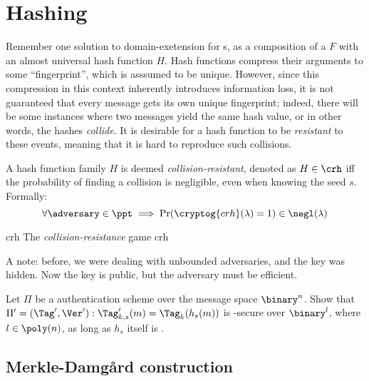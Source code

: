 \section{Hashing}

Remember one solution to domain-exetension for \prf{}s, as a composition of a \prf{} $F$ with an almost universal hash function $H$. Hash functions compress their arguments to some ``fingerprint'', which is asssumed to be unique. However, since this compression in this context inherently introduces information loss, it is not guaranteed that every message gets its own unique fingerprint; indeed, there will be some instances where two messages yield the same hash value, or in other words, the hashes \emph{collide}. It is desirable for a hash function to be \emph{resistant} to these events, meaning that it is hard to reproduce such collisions.

\begin{definition}
    A hash function family $H$ is deemed \emph{collision-resistant}, denoted as $H \in \crh$ iff the probability of finding a collision is negligible, even when knowing the seed $s$. Formally:
    \[
        \forall \adversary \in \ppt \implies \Pr(\cryptog{crh}(\lambda) = 1) \in \negl(\lambda)
    \]

    \begin{cryptogame}
        {crh}
        {The \emph{collision-resistance} game}
        {crh}


        
    \end{cryptogame}
\end{definition}

A note: before, we were dealing with unbounded adversaries, and the key was hidden. Now the key is public, but the adversary must be efficient.

\begin{exercise}
    Let $\Pi$ be a \ufcma{} authentication scheme over the message space $\binary^n$. Show that $\Pi' = (\Tag', \Ver') : \Tag'_{k, s}(m) = \Tag_k(h_s(m))$ is \ufcma-secure over $\binary^l$, where $l \in \poly(n)$, as long as $h_s$ itself is \crh.
\end{exercise}

\subsection{Merkle-Damg\r{a}rd construction}

